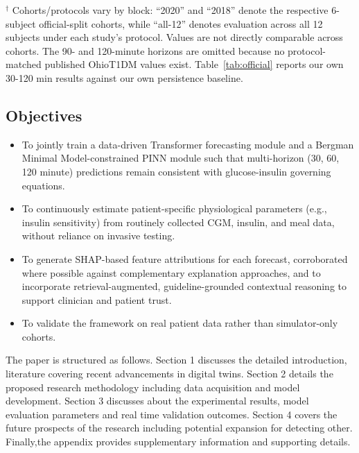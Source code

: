 \documentclass[journal]{IEEEtran}
\begin{document}
\begin{table}[t]
\vspace{2pt}
\raggedright\footnotesize
$^{\dagger}$ Cohorts/protocols vary by block: “2020” and “2018” denote the respective 6-subject official-split cohorts, while “all-12” denotes evaluation across all 12 subjects under each study’s protocol. Values are not directly comparable across cohorts. The 90- and 120-minute horizons are omitted because no protocol-matched published OhioT1DM values exist. Table~\ref{tab:official} reports our own 30-120 min results against our own persistence baseline.
\end{table}

\subsection{Objectives}
\begin{itemize}
\item To jointly train a data-driven Transformer forecasting module and a Bergman Minimal Model-constrained PINN module such that multi-horizon (30, 60, 120 minute) predictions remain consistent with glucose-insulin governing equations.
\item To continuously estimate patient-specific physiological parameters (e.g., insulin sensitivity) from routinely collected CGM, insulin, and meal data, without reliance on invasive testing.
\item To generate SHAP-based feature attributions for each forecast, corroborated where possible against complementary explanation approaches, and to incorporate retrieval-augmented, guideline-grounded contextual reasoning to support clinician and patient trust.
\item To validate the framework on real patient data rather than simulator-only cohorts.
\end{itemize}

The paper is structured as follows. Section 1 discusses the detailed introduction, literature covering recent advancements in digital twins. Section 2 details the proposed research methodology including data acquisition and model development. Section 3 discusses about the experimental results, model evaluation parameters and real time validation outcomes. Section 4 covers the future prospects of the research including potential expansion for detecting other. Finally,the appendix provides supplementary information and supporting details.

\end{document}
